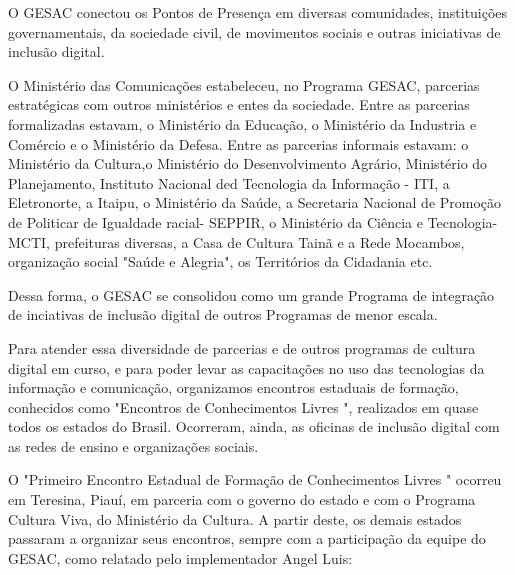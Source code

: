 O GESAC conectou os Pontos de Presença em diversas comunidades, instituições governamentais, da sociedade civil, de movimentos sociais e outras iniciativas de inclusão digital.

O Ministério das Comunicações estabeleceu, no Programa GESAC, parcerias estratégicas com outros ministérios e entes da sociedade. Entre as parcerias formalizadas estavam, o Ministério da Educação, o Ministério da Industria e Comércio e o Ministério da Defesa. Entre as parcerias informais estavam: o Ministério da Cultura,o Ministério do Desenvolvimento Agrário, Ministério do Planejamento, Instituto  Nacional ded Tecnologia da Informação - ITI,  a Eletronorte, a Itaipu, o Ministério da Saúde, a Secretaria Nacional de Promoção de Politicar de Igualdade racial- SEPPIR, o Ministério da Ciência e Tecnologia-MCTI,  prefeituras diversas, a Casa de Cultura Tainã e a Rede Mocambos, organização social "Saúde e Alegria", os Territórios da Cidadania etc.

Dessa forma, o GESAC se consolidou como um grande Programa de integração de inciativas de inclusão digital de outros Programas de menor escala.

Para atender essa diversidade de parcerias e de outros programas de cultura digital em curso, e para poder levar as capacitações no uso das tecnologias da informação e comunicação, organizamos encontros estaduais de formação, conhecidos como "Encontros de Conhecimentos Livres ", realizados em  quase todos os estados do Brasil. Ocorreram, ainda, as  oficinas de inclusão digital com as redes de ensino e organizações sociais.

O "Primeiro Encontro Estadual de Formação de Conhecimentos Livres " ocorreu em  Teresina, Piauí, em parceria com o governo do estado e com  o Programa Cultura Viva, do Ministério da Cultura. A partir deste, os demais estados passaram a organizar seus encontros, sempre com a participação da equipe do GESAC, como relatado pelo implementador Angel Luis:


\noindent\begin{center}\mbox{\centering{}}\end{center}


